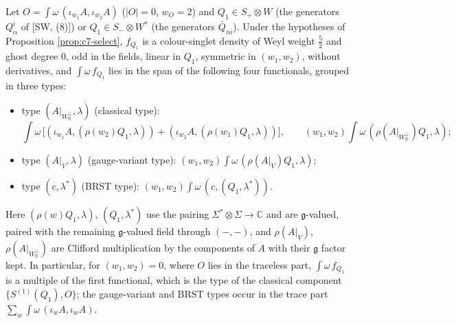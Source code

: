 \begin{corollary}
\label{cor:c7-Q}
Let $O=\int\omega\,(\iota_{w_1}A,\iota_{w_2}A)$ ($|O|=0$, $w_O=2$) and $Q_1\in S_+\otimes W$ (the generators $Q^i_\alpha$ of [SW, (8)]) or $Q_1\in S_-\otimes W^*$ (the generators $\bar Q_{\dot\alpha i}$). Under the hypotheses of Proposition \ref{prop:c7-select}, $f_{Q_1}$ is a colour-singlet density of Weyl weight $\tfrac52$ and ghost degree $0$, odd in the fields, linear in $Q_1$, symmetric in $(w_1,w_2)$, without derivatives, and $\int\omega\,f_{Q_1}$ lies in the span of the following four functionals, grouped in three types:
\begin{itemize}
\item type $(A|_{W_{\mathbb R}^\perp},\lambda)$ (classical type):
\[
\int\omega\,\Big[(\iota_{w_1}A,(\rho(w_2)Q_1,\lambda))+(\iota_{w_2}A,(\rho(w_1)Q_1,\lambda))\Big],\qquad (w_1,w_2)\int\omega\,(\rho(A|_{W_{\mathbb R}^\perp})Q_1,\lambda);
\]
\item type $(A|_V,\lambda)$ (gauge-variant type): $(w_1,w_2)\int\omega\,(\rho(A|_V)Q_1,\lambda)$;
\item type $(c,\lambda^*)$ (BRST type): $(w_1,w_2)\int\omega\,(c,(Q_1,\lambda^*))$.
\end{itemize}
Here $(\rho(w)Q_1,\lambda)$, $(Q_1,\lambda^*)$ use the pairing $\Sigma^*\otimes\Sigma\to\mathbb C$ and are $\mathfrak g$-valued, paired with the remaining $\mathfrak g$-valued field through $(-,-)$, and $\rho(A|_V)$, $\rho(A|_{W_{\mathbb R}^\perp})$ are Clifford multiplication by the components of $A$ with their $\mathfrak g$ factor kept. In particular, for $(w_1,w_2)=0$, where $O$ lies in the traceless part, $\int\omega\,f_{Q_1}$ is a multiple of the first functional, which is the type of the classical component $\{S^{(1)}(Q_1),O\}$; the gauge-variant and BRST types occur in the trace part $\sum_w\int\omega\,(\iota_wA,\iota_wA)$.
\end{corollary}

